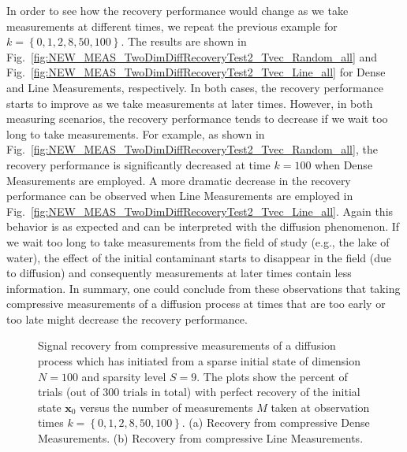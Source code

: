 \documentclass[11pt,draftcls,onecolumn]{IEEEtran}
\newcommand{\vc}[1]{\boldsymbol{#1}}
\begin{document}
In order to see how the recovery performance would change as we take measurements at different times, we repeat the previous example for $k = \left\{0,1,2,8,50,100\right\}$. The results are shown in Fig.~\ref{fig:NEW_MEAS_TwoDimDiffRecoveryTest2_Tvec_Random_all} and Fig.~\ref{fig:NEW_MEAS_TwoDimDiffRecoveryTest2_Tvec_Line_all} for Dense and Line Measurements, respectively. In both cases, the recovery performance starts to improve as we take measurements at later times.
However, in both measuring scenarios, the recovery performance tends to decrease if we wait too long to take measurements. For example, as shown in Fig.~\ref{fig:NEW_MEAS_TwoDimDiffRecoveryTest2_Tvec_Random_all}, the recovery performance is significantly decreased at time $k=100$ when Dense Measurements are employed. A more dramatic decrease in the recovery performance can be observed when Line Measurements are employed in Fig.~\ref{fig:NEW_MEAS_TwoDimDiffRecoveryTest2_Tvec_Line_all}.
Again this behavior is as expected and can be interpreted with the diffusion phenomenon. If we wait too long to take measurements from the field of study (e.g., the lake of water), the effect of the initial contaminant starts to disappear in the field (due to diffusion) and consequently measurements
at later times contain less information. In summary, one could conclude from these observations that taking compressive measurements of a diffusion process at times that are too early or too late might decrease the recovery performance.
\begin{figure}[tb]
\centering
{}
\caption{
Signal recovery from compressive measurements of a diffusion process which has initiated from a sparse initial state of dimension $N = 100$ and sparsity level $S = 9$. The plots show the percent of trials (out of $300$ trials in total) with perfect recovery of the initial state $\vc{x}_0$ versus the number of measurements $M$ taken at observation times $k = \left\{0,1,2,8,50,100\right\}$. (a) Recovery from compressive Dense Measurements. (b) Recovery from compressive Line Measurements.
}
\label{fig:NEW_MEAS_TwoDimDiffRecoveryTest2_Tvec_all}
\end{figure}
\end{document}
